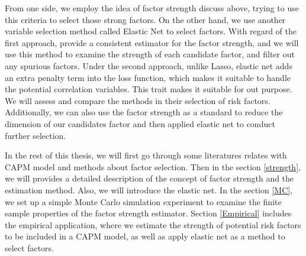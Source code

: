 From one side, we employ the idea of factor strength discuss above, trying to use this criteria to select those strong factors.
On the other hand, we use another variable selection method called Elastic Net \cite{Zou2005} to select factors.
With regard of the first approach,  provide a consistent estimator for the factor strength, and we will use this method to examine the strength of each candidate factor, and filter out any spurious factors.
Under the second approach, unlike Lasso, elastic net adds an extra penalty term into the loss function, which makes it suitable to handle the potential correlation variables.
This trait makes it suitable for out purpose.
We will assess and compare the methods in their selection of risk factors.
Additionally, we can also use the factor strength as a standard to reduce the dimension of our candidates factor and then applied elastic net to conduct further selection.


In the rest of this thesis, we will first go through some literatures relates with CAPM model and methods about factor selection.
Then in the section \ref{strength}, we will provides a detailed description of the concept of factor strength and the estimation method.
Also, we will introduce the elastic net.
In the section \ref{MC}, we set up a simple Monte Carlo simulation experiment to examine the finite sample properties of the factor strength estimator.
Section \ref{Empirical} includes the empirical application, where we estimate the strength of potential risk factors to be included in a CAPM model, as well as apply elastic net as a method to select factors.





